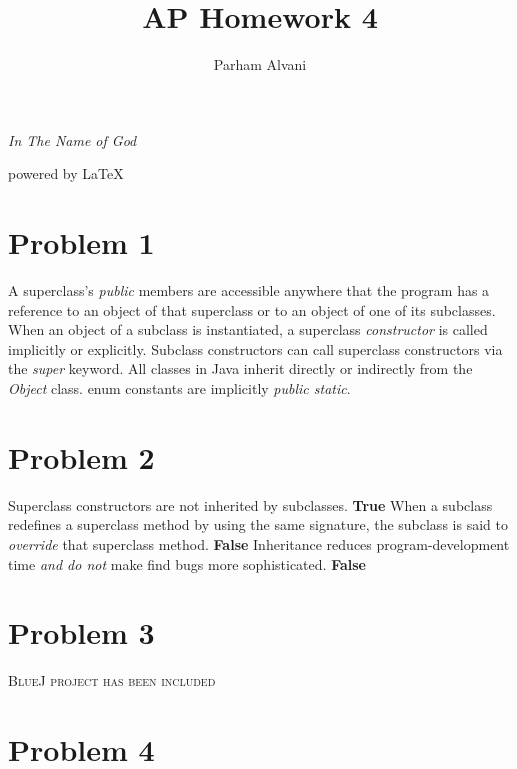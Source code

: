 \documentclass{article}
\author{Parham Alvani}
\title{AP Homework 4}
\begin{document}
\begin{titlepage}
\begin{center}
\emph{In The Name of God}
\end{center}
\newpage
\maketitle
\begin{center}
powered by \LaTeX
\end{center}
\end{titlepage}
\tableofcontents
\newpage
\section{Problem 1}
A superclass’s \textit{public} members are accessible anywhere that the program has a reference to an
object of that superclass or to an object of one of its subclasses.
\newline
When an object of a subclass is instantiated, a superclass \textit{constructor} is called implicitly or explicitly.
\newline
Subclass constructors can call superclass constructors via the \textit{super} keyword.
\newline
All classes in Java inherit directly or indirectly from the \textit{Object} class.
\newline
enum constants are implicitly \textit{public static}.
\section{Problem 2}
Superclass constructors are not inherited by subclasses. \textbf{True}
\newline
When a subclass redefines a superclass method by using the same signature, the subclass 
is said to \textit{override} that superclass method. \textbf{False}
\newline
Inheritance reduces program-development time \textit{and do not} make find bugs more sophisticated. \textbf{False}
\section{Problem 3}
\textsc{BlueJ project has been included}
\section{Problem 4}
\end{document}
